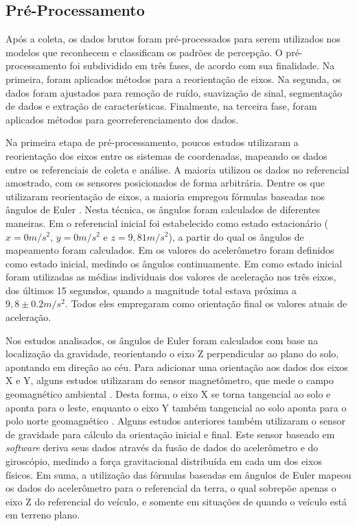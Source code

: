 \subsection{Pré-Processamento}

Após a coleta, os dados brutos foram pré-processados para serem utilizados nos modelos que reconhecem e classificam os padrões de percepção. O pré-processamento foi subdividido em três fases, de acordo com sua finalidade. Na primeira, foram aplicados métodos para a reorientação de eixos. Na segunda, os dados foram ajustados para remoção de ruído, suavização de sinal, segmentação de dados e extração de características. Finalmente, na terceira fase, foram aplicados métodos para georreferenciamento dos dados.

Na primeira etapa de pré-processamento, poucos estudos utilizaram a reorientação dos eixos entre os sistemas de coordenadas, mapeando os dados entre os referenciais de coleta e análise. A maioria utilizou os dados no referencial amostrado, com os sensores posicionados de forma arbitrária. Dentre os que utilizaram reorientação de eixos, a maioria empregou fórmulas baseadas nos ângulos de Euler \cite{Li2018,Orhan2013,Singh2017,Vittorio2014,Vlahogianni2017}. Nesta técnica, os ângulos foram calculados de diferentes maneiras. Em \cite{Singh2017,Orhan2013,Vittorio2014} o referencial inicial foi estabelecido como estado estacionário ($x=0m/s^2$, $y=0m/s^2$ e $z=9,81m/s^2$), a partir do qual os ângulos de mapeamento foram calculados. Em \cite{Li2018} os valores do acelerômetro foram definidos como estado inicial, medindo os ângulos continuamente. Em \cite{Singh2018} como estado inicial foram utilizadas as médias individuais dos valores de aceleração nos três eixos, dos últimos 15 segundos, quando a magnitude total estava próxima a $9,8 \pm 0.2 m/s^2$. Todos eles empregaram como orientação final os valores atuais de aceleração.

Nos estudos analisados, os ângulos de Euler foram calculados com base na localização da gravidade, reorientando o eixo Z perpendicular ao plano do solo, apontando em direção ao céu. Para adicionar uma orientação aos dados dos eixos X e Y, alguns estudos utilizaram do sensor magnetômetro, que mede o campo geomagnético ambiental \cite{Sattar2018}. Desta forma, o eixo X se torna tangencial ao solo e aponta para o leste, enquanto o eixo Y também tangencial ao solo aponta para o polo norte geomagnético \cite{Sattar2018}. Alguns estudos anteriores também utilizaram o sensor de gravidade para cálculo da orientação inicial e final. Este sensor baseado em \textit{software} deriva seus dados através da fusão de dados do acelerômetro e do giroscópio, medindo a força gravitacional distribuída em cada um dos eixos físicos. Em suma, a utilização das fórmulas baseadas em ângulos de Euler mapeou os dados do acelerômetro para o referencial da terra, o qual sobrepõe apenas o eixo Z do referencial do veículo, e somente em situações de quando o veículo está em terreno plano.

